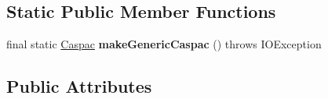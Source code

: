 \subsection*{Static Public Member Functions}
\begin{DoxyCompactItemize}
\item 
\hypertarget{classCASUAL_1_1caspac_1_1Caspac_a3ed0cafff73995413d8ced1b79083d5c}{final static \hyperlink{classCASUAL_1_1caspac_1_1Caspac}{Caspac} {\bfseries make\-Generic\-Caspac} ()  throws I\-O\-Exception}\label{classCASUAL_1_1caspac_1_1Caspac_a3ed0cafff73995413d8ced1b79083d5c}

\end{DoxyCompactItemize}
\subsection*{Public Attributes}

